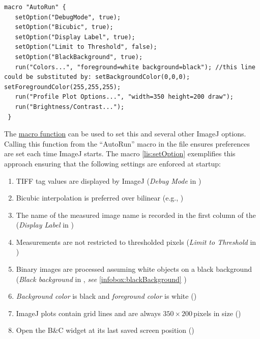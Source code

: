 \begin{lstlisting}[caption={Ensuring Specific Settings at Launch},label={lis:setOption},float=h,showstringspaces=false,tabsize=4]
 macro "AutoRun" {
   setOption("DebugMode", true);
   setOption("Bicubic", true);
   setOption("Display Label", true);
   setOption("Limit to Threshold", false);
   setOption("BlackBackground", true);
   run("Colors...", "foreground=white background=black"); //this line could be substituted by: setBackgroundColor(0,0,0); setForegroundColor(255,255,255);
   run("Profile Plot Options...", "width=350 height=200 draw");
   run("Brightness/Contrast...");
 }
\end{lstlisting}
The \texttt{} \href{http://imagej.nih.gov/ij/developer/macro/functions.html\#setOption}{macro function}
can be used to set this and several other ImageJ options. Calling
this function from the ``AutoRun''
macro in the  file ensures preferences
are set each time ImageJ starts. The macro \eqref{lis:setOption}
 exemplifies this approach ensuring that the
following settings are enforced at startup:
\begin{enumerate}
\item TIFF tag values are displayed by ImageJ (\emph{Debug Mode} in \textsf{})
\item Bicubic interpolation is preferred over bilinear (e.g.,\textsf{ })
\item The name of the measured image name is recorded in the first column
of the  (\emph{Display Label }in )
\item Measurements are not restricted to thresholded pixels (\emph{Limit
to Threshold} in )
\item Binary images are processed assuming white objects on a black background
(\emph{Black background} in ,
\emph{see} \ref{infobox:blackBackground} )
\item \emph{Background color} is black and \emph{foreground color} is white
(\textsf{})
\item ImageJ plots contain grid lines and are always $350\times200$\,pixels
in size (\textsf{})
\item Open the B\&C widget at its last saved screen position (\textsf{})
\end{enumerate}

